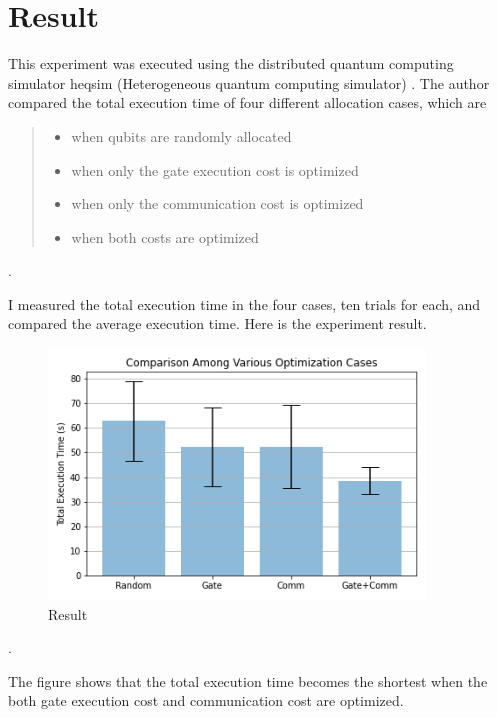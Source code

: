 \newpage
\section{Result}
This experiment was executed using the distributed quantum computing simulator heqsim (Heterogeneous quantum computing simulator) \cite{heqsim}. The author compared the total execution time of four different allocation cases, which are 
 
 \begin{quote}
 \begin{itemize}
  \item when qubits are randomly allocated
  \item when only the gate execution cost is optimized
  \item when only the communication cost is optimized
  \item when both costs are optimized
 \end{itemize}
\end{quote}.

I measured the total execution time in the four cases, ten trials for each, and compared the average execution time.  Here is the experiment result.

  \begin{figure}[h]
  		\begin{center}
  			\includegraphics[width=10cm]{img/first_experiment_plot.png}
			\caption{Result}
		\end{center}
\end{figure}.

The figure shows that the total execution time becomes the shortest when the both gate execution cost and communication cost are optimized.
 
